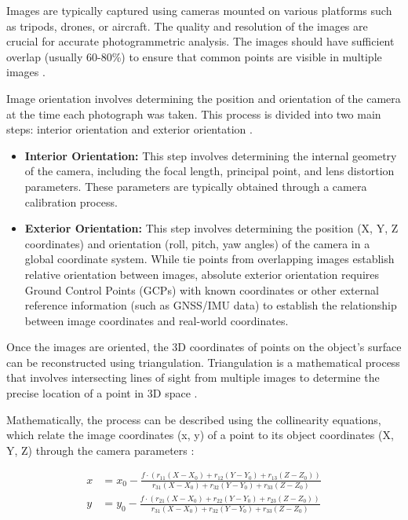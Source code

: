 \documentclass[12pt,a4paper,oneside]{report}
\begin{document}
Images are typically captured using cameras mounted on various platforms such as 
tripods, drones, or aircraft. The quality and resolution of the images are crucial 
for accurate photogrammetric analysis. The images should have sufficient overlap 
(usually 60-80\%) to ensure that common points are visible in multiple images
\cite{colominaUnmannedAerialSystems2014,nexUAV3DMapping2014}.

Image orientation involves determining the position and orientation of the camera 
at the time each photograph was taken. This process is divided into two main steps: 
interior orientation and exterior orientation 
\cite{brownCloseRangeCameraCalibration2002,triggsBundleAdjustmentModern2000}.

\begin{itemize}
    \item \textbf{Interior Orientation:} This step involves determining the internal 
    geometry of the camera, including the focal length, principal point, and lens 
    distortion parameters. These parameters are typically obtained through a camera 
    calibration process.
    \item \textbf{Exterior Orientation:} This step involves determining the position 
    (X, Y, Z coordinates) and orientation (roll, pitch, yaw angles) of the camera 
    in a global coordinate system. While tie points from overlapping images establish 
    relative orientation between images, absolute exterior orientation requires 
    Ground Control Points (GCPs) with known coordinates or other external reference 
    information (such as GNSS/IMU data) to establish the relationship between image 
    coordinates and real-world coordinates.
\end{itemize}

Once the images are oriented, the 3D coordinates of points on the object's surface 
can be reconstructed using triangulation. Triangulation is a mathematical process 
that involves intersecting lines of sight from multiple images to determine the 
precise location of a point in 3D space
\cite{hartleyMultipleViewGeometry2003,furukawaAccurateDenseRobust2010}.

Mathematically, the process can be described using the collinearity equations, which 
relate the image coordinates (x, y) of a point to its object coordinates (X, Y, Z) 
through the camera parameters
\cite{wolfElementsPhotogrammetryApplication2013,krausPhotogrammetryGeometryImages2007}:

\[
\begin{aligned}
    x &= x_0 - \frac{f \cdot (r_{11}(X - X_0) + r_{12}(Y - Y_0) + r_{13}(Z - Z_0))}{r_{31}(X - X_0) + r_{32}(Y - Y_0) + r_{33}(Z - Z_0)} \\
    y &= y_0 - \frac{f \cdot (r_{21}(X - X_0) + r_{22}(Y - Y_0) + r_{23}(Z - Z_0))}{r_{31}(X - X_0) + r_{32}(Y - Y_0) + r_{33}(Z - Z_0)}
\end{aligned}
\]
\end{document}
